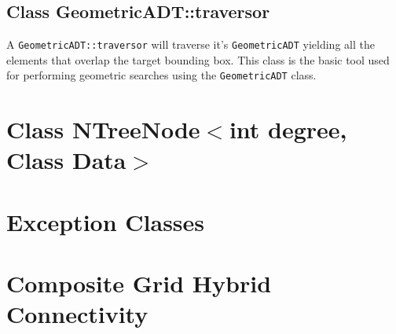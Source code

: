 \documentclass{article}
\begin{document}
\subsection{Class GeometricADT::traversor}
A {\tt GeometricADT::traversor} will traverse it's {\tt GeometricADT} yielding 
all the elements that overlap the target bounding box.  This class is the basic
tool used for performing geometric searches using the {\tt GeometricADT} class.
%
\section{Class NTreeNode$<$int degree, Class Data$>$}

\section{Exception Classes}
%
\section{Composite Grid Hybrid Connectivity}


\end{document}
